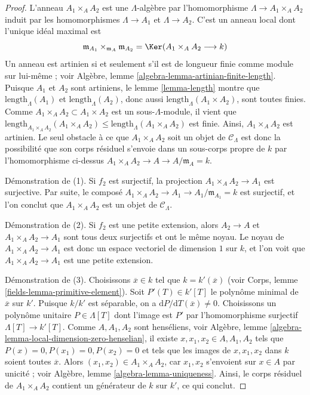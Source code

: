 \begin{proof}
L'anneau $A_1 \times_A A_2$ est une $\Lambda$-algèbre par l'homomorphisme
$\Lambda \to A_1 \times_A A_2$ induit par les homomorphismes
$\Lambda \to A_1$ et $\Lambda \to A_2$. C'est un anneau local dont l'unique
idéal maximal est
$$
\mathfrak m_{A_1} \times_{\mathfrak m_A} \mathfrak m_{A_2} =
\Ker(A_1 \times_A A_2 \longrightarrow k)
$$
Un anneau est artinien si et seulement s'il est de longueur finie comme module
sur lui-même ; voir Algèbre, lemme
\ref{algebra-lemma-artinian-finite-length}. Puisque $A_1$ et $A_2$ sont
artiniens, le lemme \ref{lemma-length} montre que
$\text{length}_\Lambda(A_1)$ et $\text{length}_\Lambda(A_2)$, donc aussi
$\text{length}_\Lambda(A_1 \times A_2)$, sont toutes finies. Comme
$A_1 \times_A A_2 \subset A_1 \times A_2$ est un sous-$\Lambda$-module, il
vient que
$\text{length}_{A_1 \times_A A_2}(A_1 \times_A A_2) \leq
\text{length}_\Lambda(A_1 \times_A A_2)$ est finie. Ainsi, $A_1
\times_A A_2$ est artinien. Le seul obstacle à ce que
$A_1 \times_A A_2$ soit un objet de $\mathcal{C}_\Lambda$ est donc la
possibilité que son corps résiduel s'envoie dans un sous-corps propre de $k$
par l'homomorphisme ci-dessus
$A_1 \times_A A_2 \to A \to A/\mathfrak m_A = k$.

\medskip\noindent
Démonstration de (1). Si $f_2$ est surjectif, la projection
$A_1 \times_A A_2 \to A_1$ est surjective. Par suite, le composé
$A_1 \times_A A_2 \to A_1 \to A_1/\mathfrak m_{A_1} = k$ est surjectif, et
l'on conclut que $A_1 \times_A A_2$ est un objet de $\mathcal{C}_\Lambda$.

\medskip\noindent
Démonstration de (2). Si $f_2$ est une petite extension, alors
$A_2 \to A$ et $A_1 \times_A A_2  \to A_1$ sont tous deux surjectifs et ont
le même noyau. Le noyau de $A_1 \times_A A_2  \to A_1$ est donc un espace
vectoriel de dimension $1$ sur $k$, et l'on voit que
$A_1 \times_A A_2  \to A_1$ est une petite extension.

\medskip\noindent
Démonstration de (3). Choisissons $\overline{x} \in k$ tel que
$k = k'(\overline{x})$ (voir Corps, lemme
\ref{fields-lemma-primitive-element}). Soit $P'(T) \in k'[T]$ le polynôme
minimal de $\overline{x}$ sur $k'$. Puisque $k/k'$ est séparable, on a
$\text{d}P/\text{d}T(\overline{x}) \not = 0$.
Choisissons un polynôme unitaire $P \in \Lambda[T]$ dont l'image est $P'$ par
l'homomorphisme surjectif $\Lambda[T] \to k'[T]$. Comme
$A, A_1, A_2$ sont henséliens, voir Algèbre, lemme
\ref{algebra-lemma-local-dimension-zero-henselian}, il existe
$x, x_1, x_2 \in A, A_1, A_2$ tels que $P(x) = 0, P(x_1) = 0,
P(x_2) = 0$ et tels que les images de $x, x_1, x_2$ dans $k$ soient toutes
$\overline{x}$.
Alors $(x_1, x_2) \in A_1 \times_A A_2$, car $x_1, x_2$ s'envoient sur
$x \in A$ par unicité ; voir Algèbre, lemme
\ref{algebra-lemma-uniqueness}. Ainsi, le corps résiduel de
$A_1 \times_A A_2$ contient un générateur de $k$ sur $k'$, ce qui conclut.
\end{proof}

